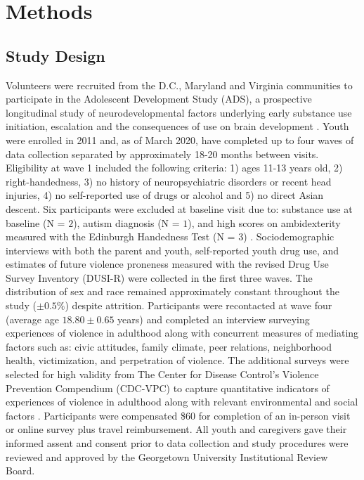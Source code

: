 \documentclass[utf8]{article}
\begin{document}
\section*{Methods}
\subsection*{Study Design} 
Volunteers were recruited from the D.C., Maryland and Virginia communities to participate in the Adolescent Development Study (ADS), a prospective longitudinal study of neurodevelopmental factors underlying early substance use initiation, escalation and the consequences of use on brain development \citep{Fishbein2016}. Youth were enrolled in 2011 and, as of March 2020, have completed up to four waves of data collection separated by approximately 18-20 months between visits. Eligibility at wave 1 included the following criteria: 1) ages 11-13 years old, 2) right-handedness, 3) no history of neuropsychiatric disorders or recent head injuries, 4) no self-reported use of drugs or alcohol and 5) no direct Asian descent. Six participants were excluded at baseline visit due to: substance use at baseline (N = $2$), autism diagnosis (N = $1$), and high scores on ambidexterity measured with the Edinburgh Handedness Test (N = $3$) \citep{veale2014edinburgh}. Sociodemographic interviews with both the parent and youth, self-reported youth drug use, and estimates of future violence proneness measured with the revised Drug Use Survey Inventory (DUSI-R) \citep{tarter1994reliability} were collected in the first three waves. The distribution of sex and race remained approximately constant throughout the study ($\pm0.5\%$) despite attrition. Participants were recontacted at wave four (average age $18.80\pm0.65$ years) and completed an interview surveying experiences of violence in adulthood along with concurrent measures of mediating factors such as: civic attitudes, family climate, peer relations, neighborhood health, victimization, and perpetration of violence. The additional surveys were selected for high validity from The Center for Disease Control’s Violence Prevention Compendium (CDC-VPC) to capture quantitative indicators of experiences of violence in adulthood along with relevant environmental and social factors \citep{dahlberg2005measuring}. Participants were compensated \$$60$ for completion of an in-person visit or online survey plus travel reimbursement. All youth and caregivers gave their informed assent and consent prior to data collection and study procedures were reviewed and approved by the Georgetown University Institutional Review Board.
\end{document}
